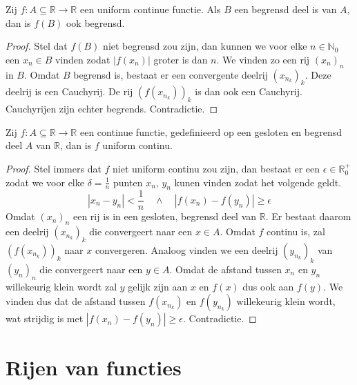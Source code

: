 \documentclass[main.tex]{subfiles}
\begin{document}
\begin{pr}
  Zij $f: A \subseteq \mathbb{R} \rightarrow \mathbb{R}$ een uniform continue functie.
  Als $B$ een begrensd deel is van $A$, dan is $f(B)$ ook begrensd.

  \begin{proof}
    Stel dat $f(B)$ niet begrensd zou zijn, dan kunnen we voor elke $n\in \mathbb{N}_{0}$ een $x_{n}\in B$ vinden zodat $|f(x_{n})|$ groter is dan $n$.
    We vinden zo een rij $(x_{n})_{n}$ in $B$.
    Omdat $B$ begrensd is, bestaat er een convergente deelrij $(x_{n_{k}})_{k}$.
    Deze deelrij is een Cauchyrij.
    De rij $(f(x_{n_{k}}))_{k}$ is dan ook een Cauchyrij.
    Cauchyrijen zijn echter begrends. Contradictie.
  \end{proof}
\end{pr}

\begin{st}
  Zij $f: A \subseteq \mathbb{R} \rightarrow \mathbb{R}$ een continue functie, gedefinieerd op een gesloten en begrensd deel $A$ van $\mathbb{R}$, dan is $f$ uniform continu.

  \begin{proof}
    Stel immers dat $f$ niet uniform continu zou zijn, dan bestaat er een $\epsilon \in \mathbb{R}_{0}^{+}$ zodat we voor elke $\delta = \frac{1}{n}$ punten $x_{n}$, $y_{n}$ kunen vinden zodat het volgende geldt.
    \[ |x_{n}-y_{n}| < \frac{1}{n} \quad\wedge\quad |f(x_{n})-f(y_{n})| \ge \epsilon \]
    Omdat $(x_{n})_{n}$ een rij is in een gesloten, begrensd deel van $\mathbb{R}$.
    Er bestaat daarom een deelrij $(x_{n_{k}})_{k}$ die convergeert naar een $x\in A$.
    Omdat $f$ continu is, zal $(f(x_{n_{k}}))_{k}$ naar $x$ convergeren.
    Analoog vinden we een deelrij $(y_{n_{k}})_{k}$ van $(y_{n})_{n}$ die convergeert naar een $y\in A$.
    Omdat de afstand tussen $x_{n}$ en $y_{n}$ willekeurig klein wordt zal $y$ gelijk zijn aan $x$ en $f(x)$ dus ook aan $f(y)$.
    We vinden dus dat de afstand tussen $f(x_{n_{k}})$ en $f(y_{n_{k}})$ willekeurig klein wordt, wat strijdig is met $|f(x_{n})-f(y_{n})| \ge \epsilon$.
    Contradictie.
  \end{proof}
\end{st}

\section{Rijen van functies}
\label{sec:rijen-van-functies}
\end{document}
